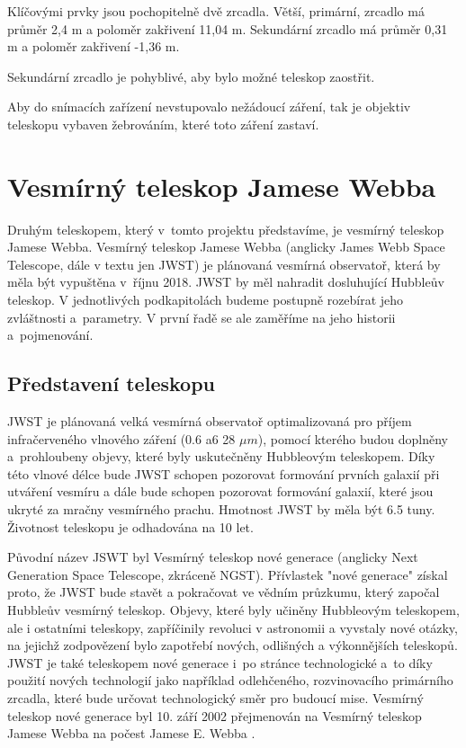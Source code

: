 \documentclass[a4paper,11pt]{article}
\begin{document}
Klíčovými prvky jsou pochopitelně dvě zrcadla. Větší, primární, zrcadlo má průměr 2,4 m a poloměr zakřivení 11,04 m. Sekundární zrcadlo má průměr 0,31 m a poloměr zakřivení -1,36 m.

Sekundární zrcadlo je pohyblivé, aby bylo možné teleskop zaostřit.

Aby do snímacích zařízení nevstupovalo nežádoucí záření, tak je objektiv teleskopu vybaven žebrováním, které toto záření zastaví.

\newpage

\section{Vesmírný teleskop Jamese Webba}

Druhým teleskopem, který v~tomto projektu představíme, je vesmírný teleskop Jamese Webba. Vesmírný teleskop Jamese Webba (anglicky James Webb Space Telescope, dále v textu jen JWST) je plánovaná vesmírná observatoř, která by měla být vypuštěna v~říjnu 2018. JWST by měl nahradit dosluhující Hubbleův teleskop. V jednotlivých podkapitolách budeme postupně rozebírat jeho zvláštnosti a~parametry. V první řadě se ale zaměříme na jeho historii a~pojmenování.

\subsection{Představení teleskopu} 
JWST je plánovaná velká vesmírná observatoř optimalizovaná pro příjem infračerveného vlnového záření (0.6 a6 28 $\mu m$), pomocí kterého budou doplněny a~prohloubeny objevy, které byly uskutečněny Hubbleovým teleskopem.
Díky této vlnové délce bude JWST schopen pozorovat formování prvních galaxií při utváření vesmíru a dále bude schopen pozorovat formování galaxií, které jsou ukryté za mračny vesmírného prachu. Hmotnost JWST by měla být 6.5 tuny. Životnost teleskopu je odhadována na 10 let.

Původní název JSWT byl Vesmírný teleskop nové generace (anglicky Next Generation Space Telescope, zkráceně NGST). Přívlastek "nové generace" získal proto, že JWST bude stavět a pokračovat ve vědním průzku\-mu, který započal Hubbleův vesmírný teleskop. Objevy, které byly učiněny Hubbleovým teleskopem, ale i ostatními teleskopy, zapříčinily revoluci v astronomii a vyvstaly nové otázky, na jejichž zodpovězení bylo zapotřebí nových, odlišných a výkonnějších teleskopů. 
JWST je také teleskopem nové generace i~po stránce technologické a~to díky použití nových technologií jako například odlehčeného, rozvinovacího primárního zrcadla, které bude určovat technologický směr pro budoucí mise.
Vesmírný teleskop nové generace byl 10. září 2002 přejmenován na Vesmírný teleskop Jamese Webba na počest Jamese E. Webba \cite{nasaFAQ}.
 
\end{document}
